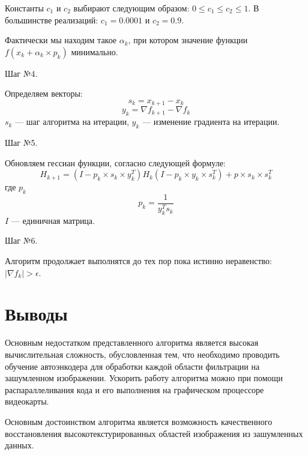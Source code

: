 \documentclass[a4paper,12pt]{article}
\begin{document}
Константы $c_1$ и $c_2$ выбирают следующим образом: $0\leq c_1 \leq c_2 \leq 1$. В большинстве реализаций: $c_1=0.0001$ и $c_2=0.9$.

Фактически мы находим такое $\alpha_k$, при котором значение функции $f(x_k+\alpha_k \times p_k)$ минимально.

Шаг №4.

Определяем векторы:
$$s_k = x_{k+1}-x_k$$
$$y_k = \nabla f_{k+1}-\nabla f_k$$
$s_k$ — шаг алгоритма на итерации, $y_k$ — изменение градиента на итерации.

Шаг №5.

Обновляем гессиан функции, согласно следующей формуле:
$$H_{k+1}=(I-p_k \times s_k \times y_k^T)H_k(I-p_k \times y_k \times s_k^T) + p \times s_k \times s_k^T$$
где $p_k$ 
$$p_k = \frac{1}{y_k^T s_k}$$
$I$ — единичная матрица.

Шаг №6.

Алгоритм продолжает выполнятся до тех пор пока истинно неравенство: $|\nabla f_k | > \epsilon$.

\newpage
\section{Выводы}

   Основным недостатком представленного алгоритма является высокая вычислительная сложность, обусловленная тем, что необходимо проводить обучение автоэнкодера для обработки каждой области фильтрации на зашумленном изображении. Ускорить работу алгоритма можно при помощи распараллеливания кода и его выполнения на графическом процессоре видеокарты. 

Основным достоинством алгоритма является возможность качественного восстановления высокотекстурированных областей изображения из зашумленных данных.
\end{document}
